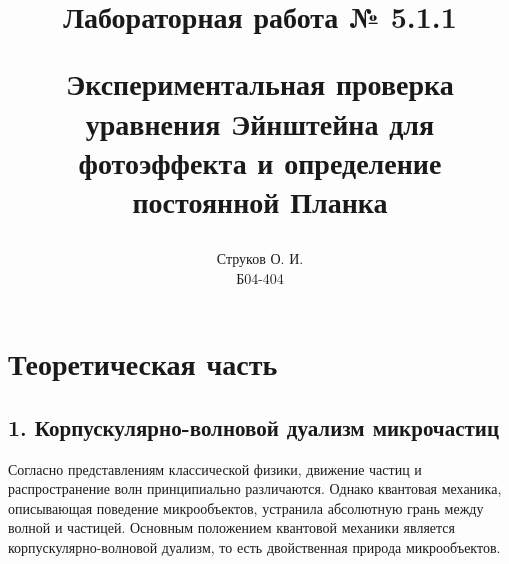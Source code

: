 \documentclass[12pt, a4paper]{article}
\begin{document}
\title{\begin{center}Лабораторная работа № 5.1.1\end{center}
Экспериментальная проверка уравнения Эйнштейна для фотоэффекта и определение постоянной Планка}
\author{Струков О. И. \\ Б04-404}
\date{}

\thispagestyle{empty}
\maketitle
\newpage
{}




\section*{Теоретическая часть}









\subsection*{1. Корпускулярно-волновой дуализм микрочастиц}
Согласно представлениям классической физики, движение частиц и распространение волн принципиально различаются. Однако квантовая механика, описывающая поведение микрообъектов, устранила абсолютную грань между волной и частицей. Основным положением квантовой механики является корпускулярно-волновой дуализм, то есть двойственная природа микрообъектов. 
\end{document}
